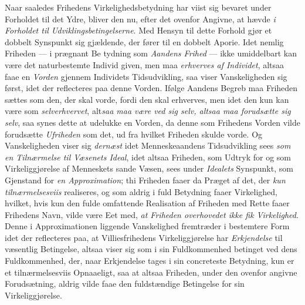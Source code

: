 Naar saaledes Frihedens Virkelighedsbetydning har viist sig bevaret under
Forholdet til det Ydre, bliver den nu, efter det ovenfor Angivne, at hævde
\emph{i Forholdet til Udviklingsbetingelserne}. Med Hensyn til dette Forhold
gjør et dobbelt Synspunkt sig gjældende, der fører til en dobbelt Aporie. Idet
nemlig Friheden --- i prægnant Be\-%
tydning som \emph{Aandens Frihed} --- ikke umiddelbart kan være det
naturbestemte Individ given, men maa \emph{erhverves af Individet}, altsaa faae
en \emph{Vorden} gjennem Individets Tidsudvikling, saa viser Vanskeligheden sig
først, idet der reflecteres paa denne Vorden. Ifølge Aandens Begreb maa Friheden
sættes som den, der skal vorde, fordi den skal erhverves, men idet den kun kan
være som \emph{selverhvervet}, alt\emph{saa maa være ved sig selv, altsaa maa
forudsætte sig selv}, saa synes dette at udelukke en Vorden, da denne som
Frihedens Vorden vilde forudsætte \emph{Ufriheden} som det, ud fra hvilket
Friheden skulde vorde. Og Vanskeligheden viser sig \emph{dernæst} idet
Menneskeaandens Tidsudvikling sees \emph{som en Tilnærmelse til Væsenets Ideal},
idet altsaa Friheden, som Udtryk for og som Virkeliggjørelse af Menneskets sande
Væsen, sees under \emph{Idealets} Synspunkt, som Gjenstand for \emph{en
Approximation}; thi Friheden faaer da Præget af det, der \emph{kun
tilnærmelsesviis} realiseres, og som aldrig i fuld Betydning faaer Virkelighed,
hvilket, hvis kun den fulde omfattende Realisation af Friheden med Rette faaer
Frihedens Navn, vilde være Eet med, \emph{at Friheden overhovedet ikke fik
Virkelighed}. Denne i Approximationen liggende Vanskelighed fremtræder i
bestemtere Form idet der reflecteres paa, at Villiesfrihedens Virkeliggjørelse
har \emph{Erkjendelse} til væsentlig Betingelse, altsaa viser sig som i sin
Fuldkommenhed betinget ved dens Fuldkommenhed, der, naar Erkjendelse tages i sin
concreteste Betydning, kun er et tilnærmelsesviis Opnaaeligt, saa at altsaa
Friheden, under den ovenfor angivne Forudsætning, aldrig vilde faae den
fuldstændige Betingelse for sin Virkeliggjørelse.

